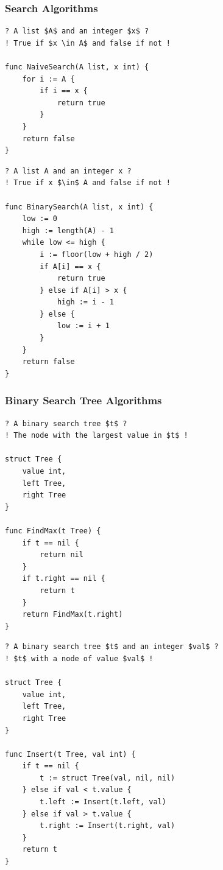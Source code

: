 \subsubsection{Search Algorithms}

\begin{lstlisting}[caption={The result of transpiling \Cref{naiveSearchGourmet} back to Gourmet.}, captionpos=b, label={naiveSearchGourmet2}]
? A list $A$ and an integer $x$ ?
! True if $x \in A$ and false if not !

func NaiveSearch(A list, x int) {
	for i := A {
		if i == x {
			return true
		}
	}
	return false
}
\end{lstlisting}

\begin{lstlisting}[caption={The result of transpiling \Cref{binarySearchGourmet} back to Gourmet.}, captionpos=b, label={binarySearchGourmet2}]
? A list A and an integer x ?
! True if x $\in$ A and false if not !

func BinarySearch(A list, x int) {
    low := 0
    high := length(A) - 1
    while low <= high {
        i := floor(low + high / 2)
        if A[i] == x {
            return true
        } else if A[i] > x {
            high := i - 1
        } else {
            low := i + 1
        }
    }
    return false
}
\end{lstlisting}

\subsubsection{Binary Search Tree Algorithms}

\begin{lstlisting}[caption={The result of transpiling \Cref{findMaxGourmet} back to Gourmet.}, captionpos=b, label={findMaxGourmet2}]
? A binary search tree $t$ ?
! The node with the largest value in $t$ !

struct Tree {
    value int,
    left Tree,
    right Tree
}

func FindMax(t Tree) {
    if t == nil {
        return nil
    }
    if t.right == nil {
        return t
    }
    return FindMax(t.right)
}
\end{lstlisting}

\begin{lstlisting}[caption={The result of transpiling \Cref{insertGourmet} back to Gourmet.}, captionpos=b, label={insertGourmet2}]
? A binary search tree $t$ and an integer $val$ ?
! $t$ with a node of value $val$ !

struct Tree {
    value int,
    left Tree,
    right Tree
}

func Insert(t Tree, val int) {
    if t == nil {
        t := struct Tree(val, nil, nil)
    } else if val < t.value {
        t.left := Insert(t.left, val)
    } else if val > t.value {
        t.right := Insert(t.right, val)
    }
    return t
}
\end{lstlisting}

